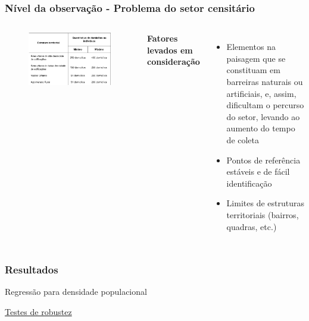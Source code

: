 \documentclass[%
    8pt, 
    aspectratio=169,
]{beamer}
\begin{document}
\begin{frame}
    \frametitle{Nível da observação - Problema do setor censitário}
    \begin{columns}
        \begin{figure}
            \includegraphics[width = \textwidth]{imagens/tabela_ibge.png}
        \end{figure}


        \textbf{Fatores levados em consideração}
        \begin{itemize}
            \item Elementos na paisagem que se constituam em barreiras naturais ou artificiais, e, assim, dificultam o percurso do setor, levando ao aumento do tempo de coleta
            \item Pontos de referência estáveis e de fácil identificação
            \item Limites de estruturas territoriais (bairros, quadras, etc.)
        \end{itemize}

    \end{columns}
\end{frame}

\begin{frame}
    \frametitle{Resultados}
    \begin{table}
        \caption{Regressão para densidade populacional}
        
    \end{table}

    \hyperlink{appendix:robustez}{Testes de robustez}

\end{frame}
\end{document}

